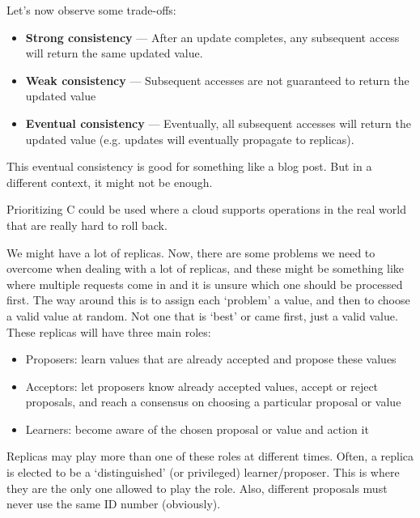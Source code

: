 \documentclass[11pt,a4paper,titlepage,dvipsnames,cmyk]{scrartcl}
\begin{document}
Let's now observe some trade-offs:
\begin{itemize}
    \item \textbf{Strong consistency} --- After an update completes, any subsequent access will return the same updated value.
    \item \textbf{Weak consistency} --- Subsequent accesses are not guaranteed to return the updated value
    \item \textbf{Eventual consistency} --- Eventually, all subsequent accesses will return the updated value (e.g. updates will eventually propagate to replicas).
\end{itemize}

This eventual consistency is good for something like a blog post. But in a different context, it might not be enough.

Prioritizing C could be used where a cloud supports operations in the real world that are really hard to roll back.

We might have a lot of replicas. Now, there are some problems we need to overcome when dealing with a lot of replicas, and these might be something like where multiple requests come in and it is unsure which one should be processed first. The way around this is to assign each `problem' a value, and then to choose a valid value at random. Not one that is `best' or came first, just a valid value. These replicas will have three main roles:

\begin{itemize}
    \item Proposers: learn values that are already accepted and propose these values
    \item Acceptors: let proposers know already accepted values, accept or reject proposals, and reach a consensus on choosing a particular proposal or value
    \item Learners: become aware of the chosen proposal or value and action it
\end{itemize}

Replicas may play more than one of these roles at different times. Often, a replica is elected to be a `distinguished' (or privileged) learner/proposer. This is where they are the only one allowed to play the role. Also, different proposals must never use the same ID number (obviously).
\end{document}

